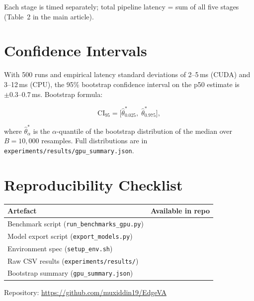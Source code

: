 \documentclass[11pt,a4paper]{article}
\begin{document}
	Each stage is timed separately; total pipeline latency = sum of all
	five stages (Table~2 in the main article).
	
	\section{Confidence Intervals}
	
	With 500 runs and empirical latency standard deviations of 2--5\,ms
	(CUDA) and 3--12\,ms (CPU), the 95\% bootstrap confidence interval
	on the p50 estimate is $\pm0.3$--$0.7$\,ms. Bootstrap formula:
	
	\begin{equation}
		\mathrm{CI}_{95} =
		\bigl[\hat{\theta}^*_{0.025},\;\hat{\theta}^*_{0.975}\bigr],
	\end{equation}
	
	where $\hat{\theta}^*_\alpha$ is the $\alpha$-quantile of the
	bootstrap distribution of the median over $B = 10{,}000$ resamples.
	Full distributions are in
	\texttt{experiments/results/gpu\_summary.json}.
	
	\section{Reproducibility Checklist}
	
	\begin{center}
		\begin{tabular}{lc}
			\toprule
			\textbf{Artefact} & \textbf{Available in repo} \\
			\midrule
			Benchmark script (\texttt{run\_benchmarks\_gpu.py}) & \checkmark \\
			Model export script (\texttt{export\_models.py})    & \checkmark \\
			Environment spec (\texttt{setup\_env.sh})            & \checkmark \\
			Raw CSV results (\texttt{experiments/results/})      & \checkmark \\
			Bootstrap summary (\texttt{gpu\_summary.json})       & \checkmark \\
			\bottomrule
		\end{tabular}
	\end{center}
	
	\bigskip
	\noindent Repository: \url{https://github.com/muxiddin19/EdgeVA}

\end{document}
